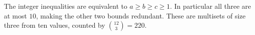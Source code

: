 The integer inequalities are equivalent to $a\ge b\ge c\ge1$. In particular all three are at most $10$, making the other two bounds redundant. These are multisets of size three from ten values, counted by $\binom{12}{3}=\boxed{220}$.

